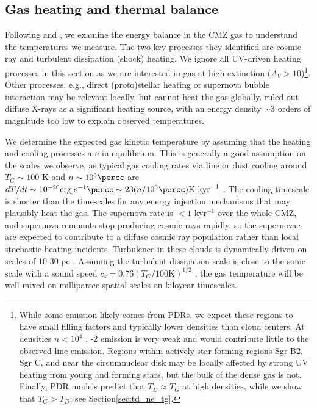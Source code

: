 \subsection{Gas heating and thermal balance}
\label{sec:heating}
Following \citet{Ao2013a} and \citet{Papadopoulos2010a}, we examine the energy
balance in the CMZ gas to understand the temperatures we measure.  The two key
processes they identified are cosmic ray and turbulent dissipation (shock)
heating.  We ignore all UV-driven heating processes in this section as we are
interested in gas at high extinction ($A_V > 10$)\footnote{While some emission
likely comes from PDRs, we expect these regions to have small filling factors
and typically lower densities than cloud centers.  At densities $n<10^4$
\percc, -2 emission is very weak and would contribute little to the
observed line emission.  Regions within actively star-forming regions
Sgr B2, Sgr C, and near the circumnuclear disk may be locally affected
by strong UV heating from young and forming stars, but the bulk of the dense
gas is not.  Finally, PDR models \citep[e.g.][]{Hollenbach1999a} predict that
$T_{D} \approx T_{G}$ at high densities, while we show that $T_{G} >
T_{D}$; see Section\ref{sec:td_ne_tg}.}.
Other processes, e.g.,  direct (proto)stellar heating
or supernova bubble interaction may be relevant locally, but cannot heat the
gas globally.  \citet{Ao2013a} ruled out diffuse X-rays as a significant
heating source, with an energy density $\sim3$ orders of magnitude too low to
explain observed temperatures.

We determine the expected gas kinetic temperature by assuming that the heating
and cooling processes are in equilibrium.  This is generally a good assumption
on the scales we observe, as typical gas cooling rates via line or dust cooling
around $T_G\sim100$ K and $n\sim10^5\percc$ are $dT/dt \sim 10^{-20}
\mathrm{erg~s}^{-1}\percc \sim 23 (n/10^5 \percc) \mathrm{K~kyr}^{-1}$
\citep[][and see below]{Goldsmith2001a}.  The cooling timescale is shorter than
the timescales for any energy injection mechanisms that may plausibly heat the
gas.  The supernova rate is $<1$ kyr$^{-1}$ over the whole CMZ, and supernova
remnants stop producing cosmic rays rapidly, so the supernovae are
expected to contribute to a diffuse cosmic ray population rather than local
stochastic heating incidents.  Turbulence in these clouds is dynamically driven
on scales of 10-30 pc \citep{Kruijssen2015a}.  Assuming the turbulent
dissipation scale is close to the sonic scale with a sound speed $c_s = 0.76
(T_G/100\mathrm{K})^{1/2}$ \kms, the gas temperature will be well mixed on milliparsec
spatial scales on kiloyear timescales.

